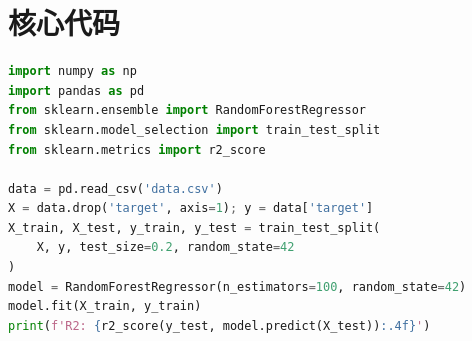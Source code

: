 \section{核心代码}

\begin{lstlisting}[language=Python]
import numpy as np
import pandas as pd
from sklearn.ensemble import RandomForestRegressor
from sklearn.model_selection import train_test_split
from sklearn.metrics import r2_score

data = pd.read_csv('data.csv')
X = data.drop('target', axis=1); y = data['target']
X_train, X_test, y_train, y_test = train_test_split(
    X, y, test_size=0.2, random_state=42
)
model = RandomForestRegressor(n_estimators=100, random_state=42)
model.fit(X_train, y_train)
print(f'R2: {r2_score(y_test, model.predict(X_test)):.4f}')
\end{lstlisting}

